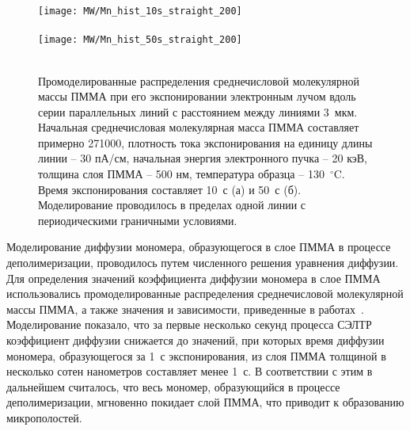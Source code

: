 \begin{figure}[t]
	\begin{center}
		\texttt{[image: MW/Mn\_hist\_10s\_straight\_200]} \\
		\vspace{-3.7em}  \vspace{2.7em} \\
		\texttt{[image: MW/Mn\_hist\_50s\_straight\_200]} \\
		\vspace{-3.7em}  \vspace{3.7em} \\
	\end{center}
	\vspace{-2.5em}
	\caption{Промоделированные распределения среднечисловой молекулярной массы ПММА при его экспонировании электронным лучом вдоль серии параллельных линий с расстоянием между линиями 3~мкм. Начальная среднечисловая молекулярная масса ПММА составляет примерно 271000, плотность тока экспонирования на единицу длины линии -- 30 пА/см, начальная энергия электронного пучка -- 20 кэВ, толщина слоя ПММА -- 500 нм, температура образца -- 130~$^\circ$C. Время экспонирования составляет 10~с (а) и 50~с (б). Моделирование проводилось в пределах одной линии с периодическими граничными условиями.}
	\label{fig:Mn_hist}
\end{figure}

Моделирование диффузии мономера, образующегося в слое ПММА в процессе деполимеризации, проводилось путем численного решения уравнения диффузии.
Для определения значений коэффициента диффузии мономера в слое ПММА использовались промоделированные распределения среднечисловой молекулярной массы \linebreak ПММА, а также значения и зависимости, приведенные в работах~\cite{Fragala_3_diffusion, Berens_diffusion_Mn}.
Моделирование показало, что за первые несколько секунд процесса СЭЛТР коэффициент диффузии снижается до значений, при которых время диффузии мономера, образующегося за 1~с экспонирования, из слоя ПММА толщиной в несколько сотен нанометров составляет менее 1~с.
В соответствии с этим в дальнейшем считалось, что весь мономер, образующийся в процессе деполимеризации, мгновенно покидает слой ПММА, что приводит к образованию микрополостей.

